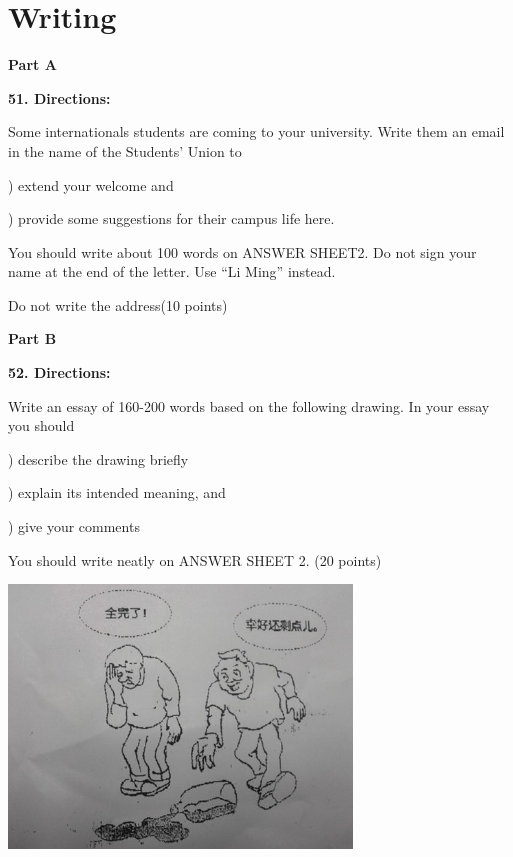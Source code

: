 
\section{Writing}

\textbf{Part A}

\textbf{51. Directions:}

\qquad Some internationals students are coming to your university. Write them an email in the name of the Students' Union to

) extend your welcome and

) provide some suggestions for their campus life here.

\qquad You should write about 100 words on ANSWER SHEET2. Do not sign your name at the end of the letter. Use ``Li Ming'' instead.

\qquad Do not write the address(10 points)


\textbf{Part B}

\textbf{52. Directions:}

\qquad Write an essay of 160-200 words based on the following drawing. In your essay you should

) describe the drawing briefly

) explain its intended meaning, and

) give your comments

\qquad You should write neatly on ANSWER SHEET 2. (20 points)

\begin{center}\includegraphics[height=7cm]{8.jpg}\end{center}

